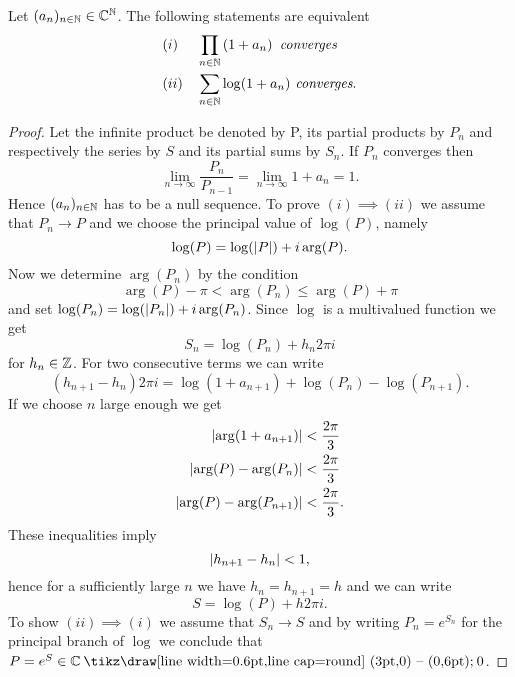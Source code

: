 \begin{lemma}
	Let $(a_n)_{n \in \mathbb{N}} \in \mathbb{C}^{\mathbb{N}}$. The following statements are equivalent
\begin{equation*}
\begin{aligned}
	&(i) &&\prod_{n \in \mathbb{N}} \left(1 + a_n\right) \textit{ converges} \\
	&(ii) &&\sum_{n \in \mathbb{N}} \log(1 + a_n) \textit{ converges}.
\end{aligned}
\end{equation*}
\end{lemma}
\begin{proof} Let the infinite product be denoted by P, its partial products by $P_n$ and respectively the series by $S$ and its partial sums by $S_n$. If $P_n$ converges then
\begin{equation*}
	\lim\limits_{n \to \infty} \frac{P_n}{P_{n - 1}} = \lim\limits_{n \to \infty} 1 + a_n = 1.
\end{equation*}
	Hence $(a_n)_{n \in \mathbb{N}}$ has to be a null sequence. To prove $(i) \implies (ii)$ we assume that $P_n \to P$ and we choose the principal value of $\log(P)$, namely
\begin{equation*}
	\log(P) = \log(\left|P\right|) + i \arg(P).
\end{equation*}
	Now we determine $\arg(P_n)$ by the condition
\begin{equation*}	
	\arg(P) - \pi < \arg(P_n) \leq \arg(P) + \pi
\end{equation*}
	and set $\log(P_n) = \log(\left|P_n\right|) + i \arg(P_n)$. Since $\log$ is a multivalued function we get
\begin{equation*}
	S_n = \log(P_n) + h_n 2 \pi i
\end{equation*}
	for $h_n \in \mathbb{Z}$. For two consecutive terms we can write
\begin{equation*}
	(h_{n + 1} - h_n) 2 \pi i = \log(1 + a_{n + 1}) + \log(P_n) - \log(P_{n + 1}).
\end{equation*}
	If we choose $n$ large enough we get
\begin{equation*}
\begin{aligned}
	\left|\arg(1 + a_{n + 1})\right| &< \frac{2 \pi}{3} \\
	\left|\arg(P) - \arg(P_n)\right| &< \frac{2 \pi}{3} \\
	\left|\arg(P) - \arg(P_{n + 1})\right| &< \frac{2 \pi}{3}.
\end{aligned}
\end{equation*}
	These inequalities imply
\begin{equation*}
	\left|h_{n + 1} - h_n\right| < 1,
\end{equation*}
	hence for a sufficiently large $n$ we have $h_n = h_{n + 1} = h$ and we can write
\begin{equation*}
	S = \log(P) + h 2 \pi i.
\end{equation*}
	To show $(ii) \implies (i)$ we assume that $S_n \to S$ and by writing $P_n = e^{S_n}$ for the principal branch of $\log$ we conclude that $P = e^{S} \in \field{C} \mysetminus {0}$.
\end{proof}


